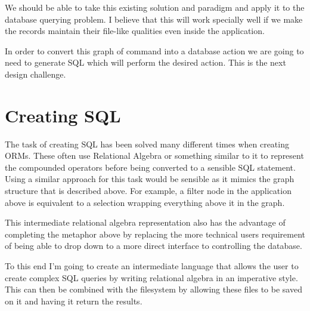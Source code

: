 We should be able to take this existing solution and paradigm and apply it to the database querying problem. I believe that this will work specially well if we make the records maintain their file-like qualities even inside the application.

In order to convert this graph of command into a database action we are going to need to generate \ac{SQL} which will perform the desired action. This is the next design challenge.

\section{Creating SQL}

The task of creating \ac{SQL} has been solved many different times when creating \acp{ORM}. These often use Relational Algebra or something similar to it to represent the compounded operators before being converted to a sensible SQL statement. Using a similar approach for this task would be sensible as it mimics the graph structure that is described above. For example, a filter node in the application above is equivalent to a selection wrapping everything above it in the graph.

This intermediate relational algebra representation also has the advantage of completing the metaphor above by replacing the more technical users requirement of being able to drop down to a more direct interface to controlling the database.

To this end I'm going to create an intermediate language that allows the user to create complex \ac{SQL} queries by writing relational algebra in an imperative style. This can then be combined with the filesystem by allowing these files to be saved on it and having it return the results.
